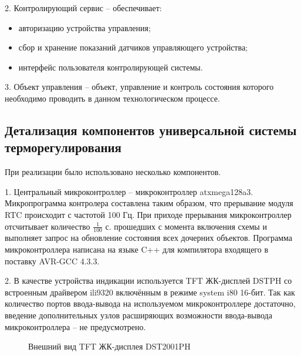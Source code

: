 \begin{par}
	2.	Контролирующий сервис -- обеспечивает:
	 	\begin{itemize}
			\item{} авторизацию устройства управления;
			\item{} сбор и хранение показаний датчиков управляющего устройства;
			\item{} интерфейс пользователя контролирующей системы.
		\end{itemize}
\end{par}

\begin{par}
	3.	Объект управления -- объект, управление и контроль состояния которого необходимо проводить
		в данном технологическом процессе.
\end{par}



\subsection{Детализация компонентов универсальной системы терморегулирования}
При реализации было использовано несколько компонентов.

\begin{par}
	1.	Центральный микроконтроллер -- микроконтроллер atxmega128a3. Микропрограмма контролера
	составлена таким образом, что прерывание модуля RTC происходит с частотой 100 Гц.
	При приходе прерывания микроконтроллер отсчитывает количество $ \frac{1}{100} $ с. прошедших с момента
	включения схемы и выполняет запрос на обновление состояния всех дочерних объектов.
	Программа микроконтроллера написана на языке C++ для компилятора входящего в поставку
	AVR-GCC 4.3.3.
\end{par}
	
\begin{par}
	2.	В качестве устройства индикации используется TFT ЖК-дисплей DST\-PH \cite{display} со встроенным
	драйвером ili9320 включённым в режиме system i80 16-бит\cite{ili9320}.
	Так как количество портов ввода\--вывода на используемом микроконтроллере достаточно, введение дополнительных узлов
	расширяющих возможности ввода\--вывода микроконтроллера -- не предусмотрено.
	\begin{figure}[ht]
		\caption{Внешний вид TFT ЖК-дисплея DST2001PH}
		\label{img:iili9320}
	\end{figure}
\end{par}

